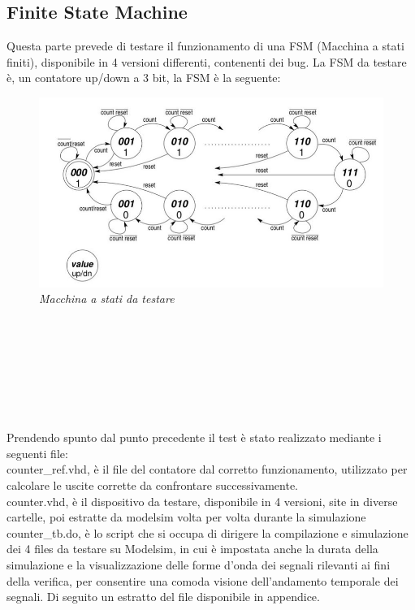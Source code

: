 \subsection{Finite State Machine}
Questa parte prevede di testare il  funzionamento di una FSM (Macchina a stati finiti), disponibile in 4 versioni differenti, contenenti dei bug.  
La FSM da testare è, un contatore up/down a 3 bit, la FSM è la seguente:
\begin{figure}[!htb]
	\centering
	\includegraphics[scale=0.3]{immagini/fsm_lab6}
	\caption{\textit{Macchina a stati da testare}}
	\label{Fsm, up-down counter}
\end{figure}
\\
\\
\\
\\
\\
\\
\\
Prendendo spunto dal punto precedente il test è stato realizzato mediante i seguenti file:\\
counter\_ref.vhd, è il file del contatore dal corretto funzionamento, utilizzato per calcolare le uscite corrette da confrontare successivamente.
\\
counter.vhd, è il dispositivo da testare, disponibile in 4 versioni, site in diverse cartelle, poi estratte da modelsim volta per volta durante la simulazione
\\
counter\_tb.do, è lo script che si occupa di dirigere la compilazione e simulazione dei 4 files da testare su Modelsim, in cui è impostata anche la durata della simulazione e la visualizzazione delle forme d’onda dei segnali rilevanti ai fini della verifica, per consentire una comoda visione dell’andamento temporale dei segnali.
Di seguito un estratto del file disponibile in appendice.
\\
